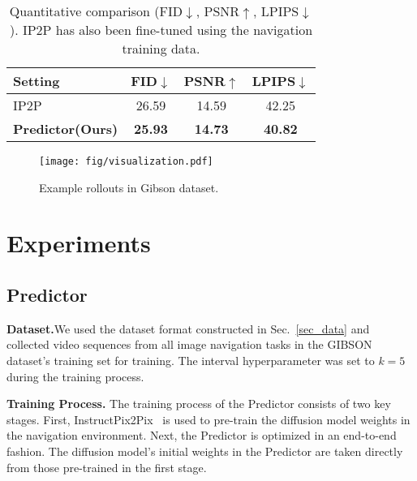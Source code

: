 \begin{table}[t]
\centering
\caption{Quantitative comparison (FID$\downarrow$, PSNR$\uparrow$, LPIPS$\downarrow$). IP2P has also been fine-tuned using the navigation training data.}
\vspace{-3mm}
\begin{tabular}{@{}lccc@{}}
\toprule
Setting            & FID$\downarrow$ & PSNR$\uparrow$    & LPIPS$\downarrow$   \\ 
\midrule
IP2P\cite{brooks2023instructpix2pix}        & 26.59          & 14.59            & 42.25   \\
\textbf{Predictor(Ours)}    & \textbf{25.93}          & \textbf{14.73}            & \textbf{40.82}   \\
\bottomrule
\end{tabular}
\label{tab:Quantitative_result}
\vspace{-3mm}
\end{table}

\begin{figure}[t]
  \centering 
  \texttt{[image: fig/visualization.pdf]}
  \vspace{-3mm}
  \caption{Example rollouts in Gibson dataset.}
  \label{fig:visualization}
\vspace{-7mm}
\end{figure}

\section{Experiments}
\label{sec_experiments}

\subsection{Predictor}
\label{exp_ffp}
\textbf{Dataset.}We used the dataset format constructed in Sec.~\ref{sec_data} and collected video sequences from all image navigation tasks in the GIBSON dataset's training set for training. The interval hyperparameter was set to $k=5$ during the training process.


\textbf{Training Process.} The training process of the Predictor consists of two key stages. First,  InstructPix2Pix~\cite{brooks2023instructpix2pix} is used to pre-train the diffusion model weights in the navigation environment. Next, the Predictor is optimized in an end-to-end fashion. The diffusion model's initial weights in the Predictor are taken directly from those pre-trained in the first stage.


